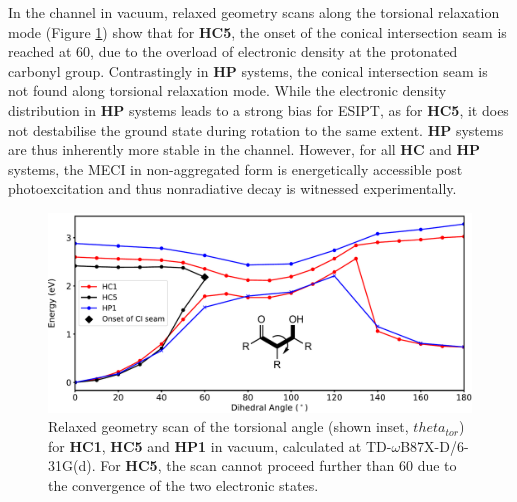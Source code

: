In the \Kstar{} channel in vacuum, relaxed geometry scans along the torsional relaxation mode (Figure \ref{figure: dihedral_scans_vac}) show that for \textbf{HC5}, the onset of the conical intersection seam is reached at 60\degree, due to the overload of electronic density at the protonated carbonyl group. Contrastingly in \textbf{HP} systems, the conical intersection seam is not found along torsional relaxation mode. While the electronic density distribution in \textbf{HP} systems leads to a strong bias for ESIPT, as for \textbf{HC5}, it does not destabilise the ground state during rotation to the same extent. \textbf{HP} systems are thus inherently more stable in the \Kstar{} channel. However, for all \textbf{HC} and \textbf{HP} systems, the MECI in non-aggregated form is energetically accessible post photoexcitation and thus nonradiative decay is witnessed experimentally.

\begin{figure}[H]
\centering
  \includegraphics[width=0.8\linewidth]{5ConnectingCrystalStructure/dihedral_scans_vac}
  \caption[Relaxed geometry scan of the torsional angle]{Relaxed geometry scan of the torsional angle (shown inset, $theta_{tor}$)  for \textbf{HC1}, \textbf{HC5} and \textbf{HP1} in vacuum, calculated at TD-$\omega$B87X-D/6-31G(d). For \textbf{HC5}, the scan cannot proceed further than 60\degree{} due to the convergence of the two electronic states.}
  \label{figure: dihedral_scans_vac}
\end{figure}

